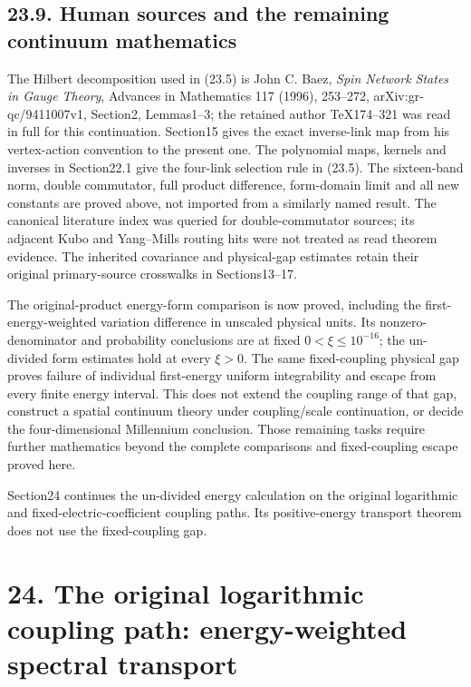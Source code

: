 \documentclass[
]{article}
\begin{document}
\subsection{23.9. Human sources and the remaining continuum
mathematics}\label{human-sources-and-the-remaining-continuum-mathematics}

The Hilbert decomposition used in (23.5) is John C. Baez, \emph{Spin
Network States in Gauge Theory}, Advances in Mathematics 117 (1996),
253--272, arXiv:gr-qc/9411007v1, Section2, Lemmas1--3; the retained
author TeX174--321 was read in full for this continuation. Section15
gives the exact inverse-link map from his vertex-action convention to
the present one. The polynomial maps, kernels and inverses in
Section22.1 give the four-link selection rule in (23.5). The
sixteen-band norm, double commutator, full product difference,
form-domain limit and all new constants are proved above, not imported
from a similarly named result. The canonical literature index was
queried for double-commutator sources; its adjacent Kubo and Yang--Mills
routing hits were not treated as read theorem evidence. The inherited
covariance and physical-gap estimates retain their original
primary-source crosswalks in Sections13--17.

The original-product energy-form comparison is now proved, including the
first-energy-weighted variation difference in unscaled physical units.
Its nonzero-denominator and probability conclusions are at fixed
\(0<\xi\le10^{-16}\); the un-divided form estimates hold at every
\(\xi>0\). The same fixed-coupling physical gap proves failure of
individual first-energy uniform integrability and escape from every
finite energy interval. This does not extend the coupling range of that
gap, construct a spatial continuum theory under coupling/scale
continuation, or decide the four-dimensional Millennium conclusion.
Those remaining tasks require further mathematics beyond the complete
comparisons and fixed-coupling escape proved here.

Section24 continues the un-divided energy calculation on the original
logarithmic and fixed-electric-coefficient coupling paths. Its
positive-energy transport theorem does not use the fixed-coupling gap.

\section{24. The original logarithmic coupling path: energy-weighted
spectral
transport}\label{the-original-logarithmic-coupling-path-energy-weighted-spectral-transport}
\end{document}
